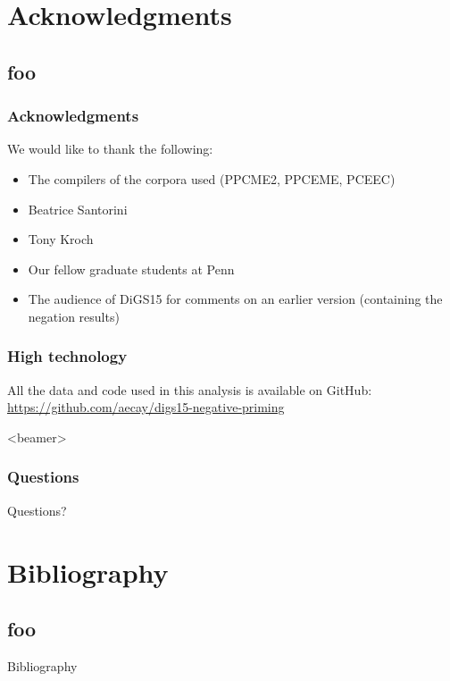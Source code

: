 \documentclass{digs-slides}
\begin{document}
\appendix{}

\section{Acknowledgments}

\subsection{foo}

\begin{frame}
    \frametitle{Acknowledgments}
    We would like to thank the following:
    \begin{itemize}
      \item The compilers of the corpora used (PPCME2, PPCEME, PCEEC)
      \item Beatrice Santorini
      \item Tony Kroch
      \item Our fellow graduate students at Penn
      \item The audience of DiGS15 for comments on an earlier version
        (containing the negation results)
    \end{itemize}
\end{frame}

\begin{frame}
    \frametitle{High technology}
    All the data and code used in this analysis is available on GitHub:
    \url{https://github.com/aecay/digs15-negative-priming}
\end{frame}

\begin{frame}<beamer>
    \frametitle{Questions}
    \begin{center}
        \Huge
        Questions?
    \end{center}
\end{frame}

\section{Bibliography}
\label{sec:bibliography}

\subsection*{foo}

\begin{frame}[allowframebreaks=0.9]{Bibliography}
    \printbibliography[heading=none]
\end{frame}

\end{document}

